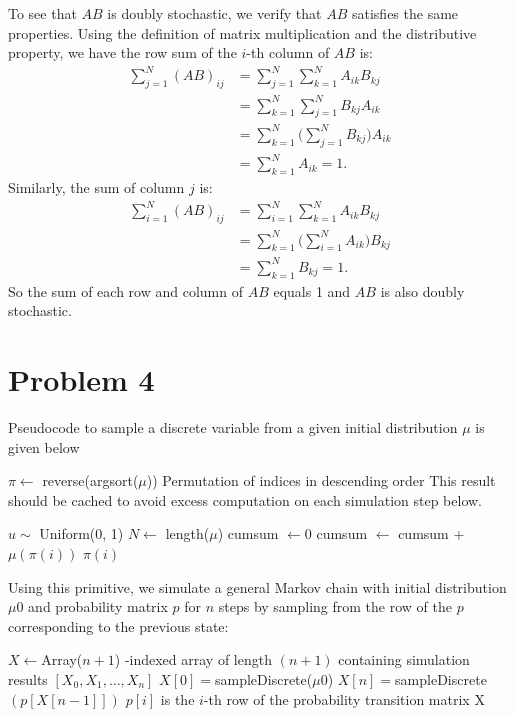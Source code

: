 \documentclass{homework}
\begin{document}
\begin{letterenum}
To see that $AB$ is doubly stochastic, we verify that $AB$ satisfies the
same properties. Using the definition of matrix multiplication and the
distributive property, we have the row sum of the $i$-th
column of $AB$ is:
\begin{align*}
    \sum_{j=1}^N (AB)_{ij} &= \sum_{j=1}^{N} \sum_{k=1}^N A_{ik} B_{kj} \\
        &= \sum_{k=1}^{N} \sum_{j=1}^N B_{kj} A_{ik} \\
        &= \sum_{k=1}^{N} \biggl(\sum_{j=1}^N B_{kj} \biggr) A_{ik} \\
        &= \sum_{k=1}^{N} A_{ik} = 1.
\end{align*}
Similarly, the sum of column $j$ is:
\begin{align*}
    \sum_{i=1}^N (AB)_{ij} &= \sum_{i=1}^N \sum_{k=1}^N A_{ik} B_{kj} \\
        &= \sum_{k=1}^N \biggl(\sum_{i=1}^N A_{ik} \biggr) B_{kj} \\
        &= \sum_{k=1}^N B_{kj} = 1.
\end{align*}
So the sum of each row and column of $AB$ equals 1 and $AB$ is also doubly
stochastic.
\end{letterenum}

\section{Problem 4}

Pseudocode to sample a discrete variable from a given initial distribution $\mu$
is given below
\begin{algorithmic}
        \State $\pi \gets $ reverse(argsort($\mu$))
        \Comment Permutation of indices in descending order
        \State \Comment This result should be cached to avoid excess
        \State \Comment computation on each simulation step below.

        \State $u \sim$ Uniform(0, 1) 
        \State $N \gets$ length($\mu$)
        \State cumsum $\gets 0$
            \State cumsum $\gets$ cumsum + $\mu(\pi(i))$
                \State \Return $\pi(i)$
            \EndIf
        \EndFor
    \EndFunction
\end{algorithmic}
Using this primitive, we simulate a general Markov chain with initial distribution
$\mu0$ and probability matrix $p$ for $n$ steps by sampling from the row of the
$p$ corresponding to the previous state:
\begin{algorithmic}
        \State $X \gets $Array($n+1$)
        -indexed array of length $(n+1)$ containing
        \State \Comment simulation results $[X_0, X_1, \dots, X_n]$
        \State $X[0] = $sampleDiscrete($\mu0$)
            \State $X[n] = $sampleDiscrete$(p[X[n-1]])$
            \Comment $p[i]$ is the $i$-th row of the probability transition matrix
        \EndFor
        \State \Return X
    \EndFunction
\end{algorithmic}
\end{document}
